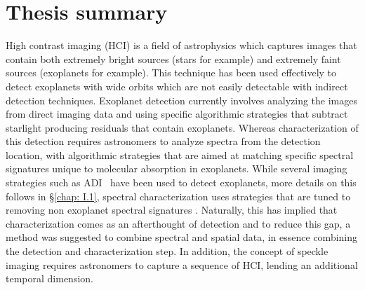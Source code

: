 \chapter*{Thesis summary}
High contrast imaging (HCI) is a field of astrophysics which captures images that contain both extremely bright sources (stars for example) and extremely faint sources (exoplanets for example).
This technique has been used effectively to detect exoplanets with wide orbits which are not easily detectable with indirect detection techniques.
Exoplanet detection currently involves analyzing the images from direct imaging data and using specific algorithmic strategies that subtract starlight producing residuals that contain exoplanets.
Whereas characterization of this detection requires astronomers to analyze spectra from the detection location, with algorithmic strategies that are aimed at matching specific spectral signatures unique to molecular absorption in exoplanets.
While several imaging strategies such as ADI~\citep[][]{2006MaroisADI} have been used to detect exoplanets, more details on this follows in 
\S\ref{chap: I.1}, spectral characterization uses strategies that are tuned to removing non exoplanet spectral signatures \citep[e.g][]{2002SparksSDI}.
Naturally, this has implied that characterization comes as an afterthought of detection and to reduce this gap, a method was suggested to combine spectral and spatial data, in essence combining the detection 
and characterization step.
In addition, the concept of speckle imaging requires astronomers to capture a sequence of HCI, lending an additional temporal dimension.

